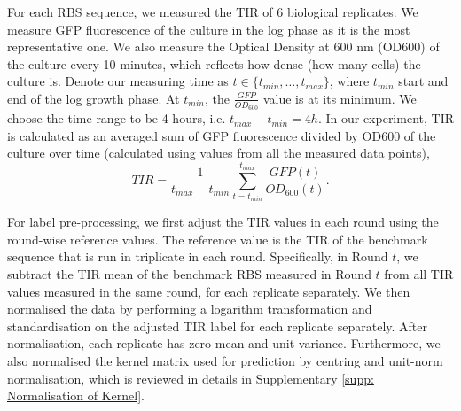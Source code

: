 \documentclass{scrartcl}[2013/05/29]%
\begin{document}
For each RBS sequence, we measured the TIR of 6 biological replicates.
We measure GFP fluorescence of the culture in the log phase as it is the most representative one.
We also measure the Optical Density at 600 nm (OD600) of the culture every 10 minutes, which reflects how dense (how many cells) the culture is. Denote our measuring time as $t \in \{t_{min}, \ldots, t_{max}\}$, where ${t_{min}}$ start and end of the log growth phase.
At $t_{min}$, the $\frac{GFP}{OD_{600}}$ value is at its minimum.
We choose the time range to be 4 hours, i.e. $t_{max} - t_{min} = 4h$.
In our experiment, TIR is calculated as an averaged sum of GFP fluorescence divided by OD600 of the culture over time (calculated using values from all the measured data points),
$$TIR=\frac{1}{t_{max} - t_{min}} \sum_{t = t_{min}}^{t_{max}}\frac{GFP(t)}{OD_{600}(t)}.$$




For label pre-processing, we first adjust the TIR values in each round using the round-wise reference values.
The reference value is the TIR of the benchmark sequence that is run in triplicate in each round.
Specifically, in Round $t$, we subtract the TIR mean of the benchmark RBS measured in Round $t$ from all TIR values measured in the same round, for each replicate separately. 
We then normalised the data by performing a logarithm transformation and standardisation on the adjusted TIR label for each replicate separately.
After normalisation, each replicate has zero mean and unit variance.
Furthermore, we also normalised the kernel matrix used for prediction by centring and unit-norm normalisation, which is reviewed in details in Supplementary \ref{supp: Normalisation of Kernel}.
\end{document}
